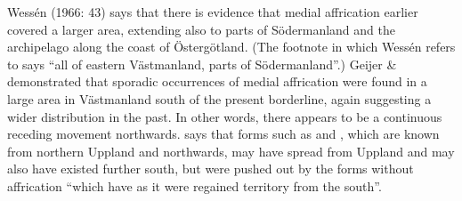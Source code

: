Wessén (1966: 43) says that there is evidence that medial affrication earlier covered a larger area, extending also to parts of Södermanland and the archipelago along the coast of Östergötland. (The footnote in \citet[36]{Hesselman1905} which Wessén refers to says “all of eastern Västmanland, parts of Södermanland”.) Geijer \& \citet{Holmkvist1930} demonstrated that sporadic occurrences of medial affrication were found in a large area in Västmanland south of the present borderline, again suggesting a wider distribution in the past. In other words, there appears to be a continuous receding movement northwards. \citet[80]{Reinhammar2005} says that forms such as  and , which are known from northern Uppland and northwards, may have spread from Uppland and may also have existed further south, but were pushed out by the forms without affrication “which have as it were regained territory from the south”.


